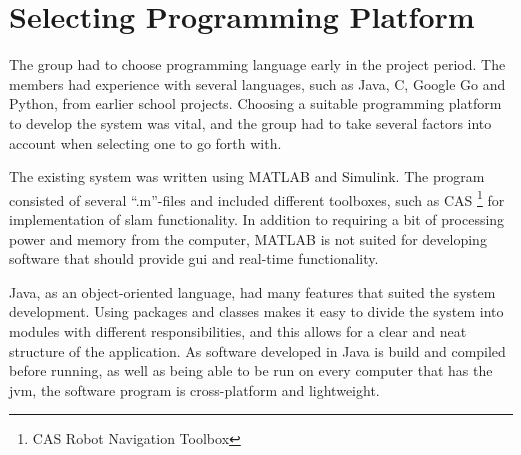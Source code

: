\section{Selecting Programming Platform}
The group had to choose programming language early in the project period. The members had experience with several languages, such as Java, C, Google Go and Python, from earlier school projects.  Choosing a suitable programming platform to develop the system was vital, and the group had to take several factors into account when selecting one to go forth with.

The existing system was written using MATLAB and Simulink. The program consisted of several ``.m''-files and included different toolboxes,  such as CAS \footnote{CAS Robot Navigation Toolbox} for  implementation of \acrshort{slam} functionality. In addition to requiring a bit of processing power and memory from the computer, MATLAB is not suited for developing software that should provide \acrshort{gui} and real-time functionality.

Java, as an object-oriented language, had many features that suited the system development. Using packages and classes makes it easy to divide the system into modules with different responsibilities, and this allows for a clear and neat structure of the application. As software developed in Java is build and compiled before running, as well as being able to be run on every computer that has the \acrfull{jvm}, the software program is cross-platform and lightweight.